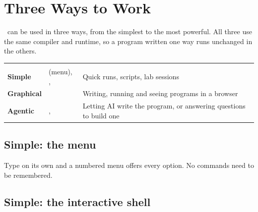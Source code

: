 \chapter{Three Ways to Work}
\label{ch:modes}

\algolang\ can be used in three ways, from the simplest to the most powerful. All three use the same compiler and runtime, so a program written one way runs unchanged in the others.

\begin{center}
\small
\begin{tabularx}{\linewidth}{@{}L{2.6cm}L{5.0cm}Y@{}}
\toprule
{} &  & \\
\goldrule
\textbf{Simple} &  (menu), ,  & Quick runs, scripts, lab sessions\\
\textbf{Graphical} &  & Writing, running and seeing programs in a browser\\
\textbf{Agentic} & ,  & Letting AI write the program, or answering questions to build one\\
\bottomrule
\end{tabularx}
\end{center}

\section{Simple: the menu}

Type  on its own and a numbered menu offers every option. No commands need to be remembered.


\section{Simple: the interactive shell}

